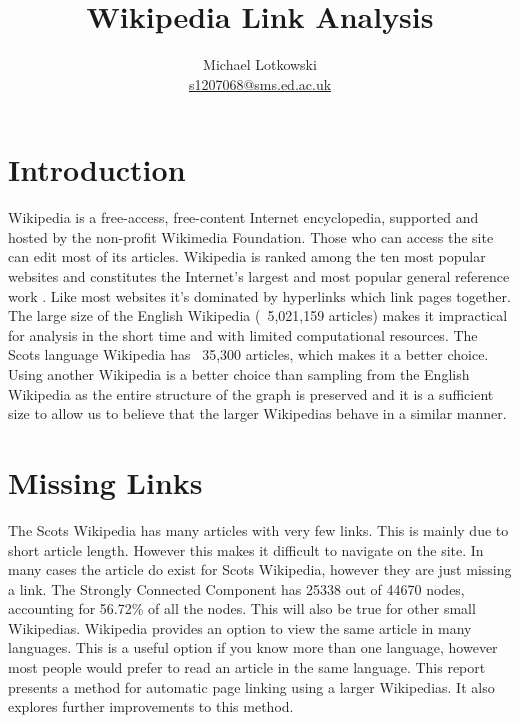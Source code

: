 \documentclass[11pt]{amsart}
\title{Wikipedia Link Analysis}
\author{Michael Lotkowski \\ \href{mailto:s1207068@sms.ed.ac.uk}{s1207068@sms.ed.ac.uk}}
\begin{document}
\onehalfspacing
\maketitle

\begin{multicols}{2}

\section{Introduction}
Wikipedia is a free-access, free-content Internet encyclopedia, supported and hosted by the non-profit Wikimedia Foundation. Those who can access the site can edit most of its articles. Wikipedia is ranked among the ten most popular websites and constitutes the Internet's largest and most popular general reference work \cite{wikipedia}. Like most websites it's dominated by hyperlinks which link pages together. The large size of the English Wikipedia (~5,021,159 articles)\cite{wikipedia_stats} makes it impractical for analysis in the short time and with limited computational resources. The Scots language Wikipedia has ~35,300 articles\cite{wikipedia_stats}, which makes it a better choice. Using another Wikipedia is a better choice than sampling from the English Wikipedia as the entire structure of the graph is preserved and it is a sufficient size to allow us to believe that the larger Wikipedias behave in a similar manner. 

\section{Missing Links}
The Scots Wikipedia has many articles with very few links. This is mainly due to short article length. However this makes it difficult to navigate on the site. In many cases the article do exist for Scots Wikipedia, however they are just missing a link. The Strongly Connected Component has 25338 out of 44670 nodes, accounting for 56.72\% of all the nodes. This will also be true for other small Wikipedias. Wikipedia provides an option to view the same article in many languages. This is a useful option if you know more than one language, however most people would prefer to read an article in the same language. This report presents a method for automatic page linking using a larger Wikipedias. It also explores further improvements to this method.


\end{multicols}
\end{document}
